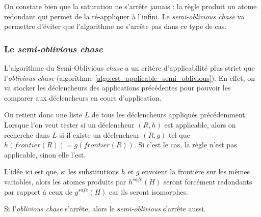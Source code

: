 On constate bien que la saturation ne s'arrête jamais : la règle produit un atome redondant qui permet de la ré-appliquer à l'infini. Le \textit{semi-oblivious chase} va permettre d'éviter que l'algorithme ne s'arrête pas dans ce type de cas.

\subsubsection{Le \textit{semi-oblivious chase}}\label{sec:semi_oblivious_chase}



L'algorithme du Semi-Oblivious \textit{chase} a un critère d'applicabilité plus strict que l'\textit{oblivious chase} (algorithme \ref{algo:est_applicable_semi_oblivious}). En effet, on va stocker les déclencheurs des applications précédentes pour pouvoir les comparer aux déclencheurs en cours d'application.
\par On retient donc une liste $L$ de tous les déclencheurs appliqués précédemment. Lorsque l'on veut tester si un déclencheur $(R,h)$ est applicable, alors on recherche dans $L$ si il existe un déclencheur $(R,g)$ tel que $h(frontier(R)) = g(frontier(R))$. Si c'est le cas, la règle n'est pas applicable, sinon elle l'est.
\par L'idée ici est que, si les substitutions $h$ et $g$ envoient la frontière sur les mêmes variables, alors les atomes produits par $h^{safe}(H)$ seront forcément redondants par rapport à ceux de $g^{safe}(H)$ car ils seront isomorphes.

\begin{proposition}
    Si l'\textit{oblivious chase} s'arrête, alors le \textit{semi-oblivious} s'arrête aussi.
\end{proposition}

